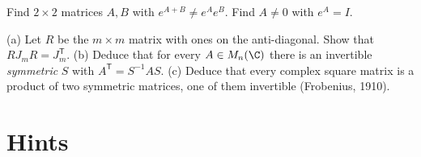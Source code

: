 \begin{exercise}[$\star\star$]\label{linear:ex:expsum}
Find $2\times2$ matrices $A,B$ with $e^{A+B}\ne e^Ae^B$. Find $A\ne0$ with $e^A=I$.
\end{exercise}

\begin{exercise}[$\star\star\star$]\label{linear:ex:symprod}
(a) Let $R$ be the $m\times m$ matrix with ones on the anti-diagonal. Show that $RJ_mR=J_m^{\mathsf T}$. (b) Deduce that for
every $A\in M_n(\C)$ there is an invertible \emph{symmetric} $S$ with $A^{\mathsf T}=S^{-1}AS$. (c) Deduce that every complex
square matrix is a product of two symmetric matrices, one of them invertible (Frobenius, 1910).
\end{exercise}

\section{Hints}

